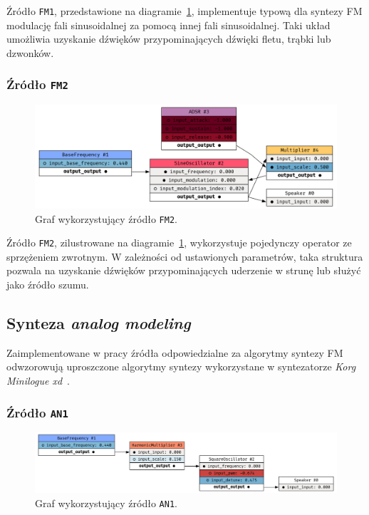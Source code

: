 Źródło \texttt{FM1}, przedstawione na diagramie~\ref{fig:gene_f2},
implementuje typową dla syntezy FM
modulację fali sinusoidalnej za pomocą innej fali sinusoidalnej. Taki układ umożliwia
uzyskanie dźwięków przypominających dźwięki fletu, trąbki lub dzwonków.

\subsubsection{Źródło \texttt{FM2}}

\begin{figure}[H]
    \centering
    \includegraphics[width=1.0\linewidth]{rys06/gene_fm2.png}
    \caption{
      Graf wykorzystujący źródło \texttt{FM2}.
    }\label{fig:gene_f2}
\end{figure}

Źródło \texttt{FM2}, zilustrowane na diagramie~\ref{fig:gene_f2}, wykorzystuje pojedynczy
operator ze sprzężeniem zwrotnym. W zależności od ustawionych parametrów, taka struktura pozwala
na uzyskanie dźwięków przypominających uderzenie w strunę lub służyć jako źródło szumu.

\subsection{Synteza \textit{analog modeling}}

Zaimplementowane w pracy źródła odpowiedzialne za algorytmy syntezy FM odwzorowują uproszczone algorytmy syntezy wykorzystane
w syntezatorze \textit{Korg Minilogue xd}~\cite{yamaha_dx7_manual}.

\subsubsection{Źródło \texttt{AN1}}

\begin{figure}[H]
    \centering
    \includegraphics[width=1.0\linewidth]{rys06/gene_an1.png}
    \caption{
      Graf wykorzystujący źródło \texttt{AN1}.
    }\label{fig:gene_an1}
\end{figure}

